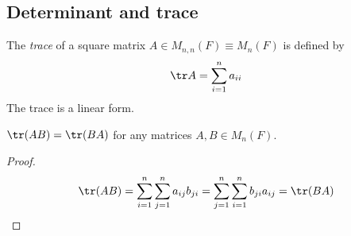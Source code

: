 \subsection{Determinant and trace}
\begin{definition}
	The \textit{trace} of a square matrix \( A \in M_{n,n}(F) \equiv M_n(F) \) is defined by
	\[ \tr A = \sum_{i=1}^n a_{ii} \]
	The trace is a linear form.
\end{definition}
\begin{lemma}
	\( \tr (AB) = \tr (BA) \) for any matrices \( A, B \in M_n(F) \).
\end{lemma}
\begin{proof}
	\[ \tr (AB) = \sum_{i=1}^n \sum_{j=1}^n a_{ij} b_{ji} = \sum_{j=1}^n \sum_{i=1}^n b_{ji} a_{ij} = \tr (BA) \]
\end{proof}
